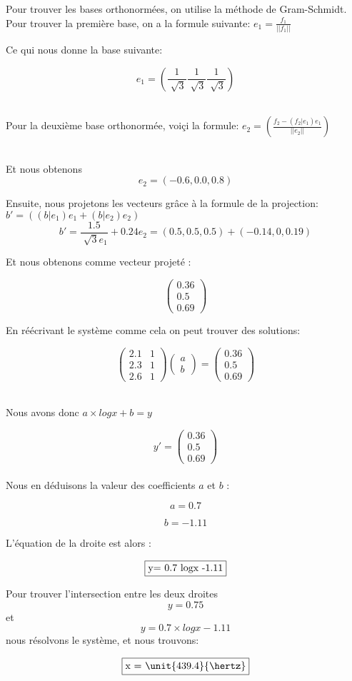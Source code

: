 Pour trouver les bases orthonormées, on utilise la méthode de Gram-Schmidt.
\\
Pour trouver la première base, on a la formule suivante: $e_1=\frac{f_1}{||f_1||}$

Ce qui nous donne la base suivante:

\[e_1=( \frac{1}{\sqrt[]{3}} \frac{1}{\sqrt[]{3}} \frac{1}{\sqrt[]{3}})\]

\\ 
Pour la deuxième base orthonormée, voiçi la formule:  $e_2=(\frac{f_2-(f_2|e_1)e_1}{||e_2||})$

\\Et nous obtenons
\[e_2=( -0.6, 0.0, 0.8)\]

\bigbreak
Ensuite, nous projetons les vecteurs grâce à la formule de la projection: $b'=((b|e_1)e_1+(b|e_2)e_2)$
\[b'=\frac{1.5}{\sqrt[]{3}e_1}+0.24e_2=(0.5,0.5,0.5)+(-0.14,0,0.19)\]

Et nous obtenons comme vecteur projeté :

$$
\begin{pmatrix}  
	0.36\\
	0.5\\
	0.69
\end{pmatrix}
$$

\bigbreak
En réécrivant le système comme cela on peut trouver des solutions:

$$
\begin{pmatrix}  
 2.1 & 1\\
 2.3 & 1 \\
 2.6 & 1 
\end{pmatrix}
\begin{pmatrix}  
a\\
b
\end{pmatrix}
=
\begin{pmatrix}  
0.36\\
0.5\\
0.69
\end{pmatrix}
$$

\bigbreak

\\
Nous avons donc $a\times log{x} + b=y$ \Rightarrow 

$$
y'=
\begin{pmatrix}  
0.36\\
0.5\\
0.69
\end{pmatrix}
$$
\\

Nous en déduisons la valeur des coefficients $a$ et $b$ :  

$$a =0.7$$

$$b= -1.11$$

L'équation de la droite est alors :

$$\fbox{y= 0.7 log{x} -1.11}$$

Pour trouver l'intersection entre les deux droites $$y=0.75$$ et $$y= 0.7 \times log{x} -1.11$$ nous résolvons le système, et nous trouvons: 

$$\fbox{x = \unit{439.4}{\hertz}}$$ 


